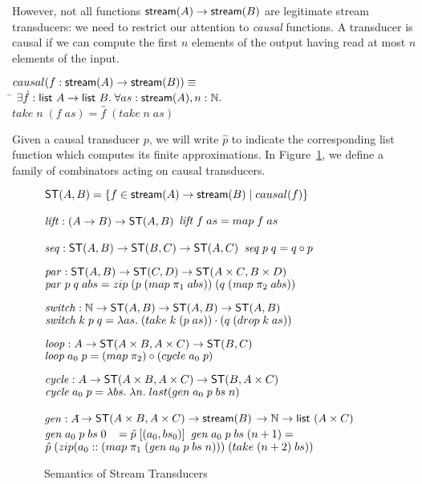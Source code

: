 \documentclass[preprint,natbib]{sigplanconf}
\begin{document}
However, not all functions $\mbox{\textsf{{stream}}}({A}) \to \mbox{\textsf{{stream}}}({B})$ are legitimate
stream transducers: we need to restrict our attention to \emph{causal}
functions. A transducer is causal if we can compute the first
$n$ elements of the output having read at most $n$ elements of
the input. 

\begin{tabbing}
$causal(f : \mbox{\textsf{{stream}}}({A}) \to \mbox{\textsf{{stream}}}({B})) \equiv$ \\
\;\;\= $\exists \hat{f} : \mbox{\textsf{{list }}}{A} \to \mbox{\textsf{{list }}}{B}.\;\forall as:\mbox{\textsf{{stream}}}({A}), n:\mathbb{N}.$ \\
    \> \;\;$take\;n\;(f\;as) = \hat{f}\;(take\;n\;as)$ 
\end{tabbing}

Given a causal transducer $p$, we will write $\hat{p}$ to indicate the
corresponding list function which computes its finite
approximations. In Figure~\ref{transducer-semantics}, we define a
family of combinators acting on causal transducers.

\begin{figure}
{\small
\begin{specification}
$\mbox{\textsf{{ST}}}({A}, {B}) = \{{{f \in \mbox{\textsf{{stream}}}({A}) \to \mbox{\textsf{{stream}}}({B})}\;|\;{causal(f)}}\}$

$\mathit{lift} : (A \to B) \to \mbox{\textsf{{ST}}}({A}, {B})$ \nextline
$\mathit{lift} \;f\;as = map\;f\;as$ 

$\mathit{seq}  : \mbox{\textsf{{ST}}}({A}, {B}) \to \mbox{\textsf{{ST}}}({B}, {C}) \to \mbox{\textsf{{ST}}}({A}, {C})$ \nextline
$\mathit{seq} \;p\;q = q \circ p$ 

$\mathit{par}  : \mbox{\textsf{{ST}}}({A}, {B}) \to \mbox{\textsf{{ST}}}({C}, {D}) \to \mbox{\textsf{{ST}}}({A \times C}, {B \times D})$ \nextline
$\mathit{par} \; p\;q\;abs = zip\; (p\;(map\;\pi_1\;abs))\;(q\;(\mathit{map}\;\pi_2\;abs))$

$\mathit{switch} : \mathbb{N} \to \mbox{\textsf{{ST}}}({A}, {B}) \to \mbox{\textsf{{ST}}}({A}, {B}) \to \mbox{\textsf{{ST}}}({A}, {B})$ \nextline
$\mathit{switch}\;k\;p\;q = \lambda as.\;(take\;k\;(p\;as))\cdot(q\;(drop\;k\;as))$ 

$\mathit{loop} : A \to \mbox{\textsf{{ST}}}({A\times B}, {A \times C}) \to \mbox{\textsf{{ST}}}({B}, {C})$ \nextline
$\mathit{loop}\;a_0\;p = (map\;\pi_2) \circ (cycle\;a_0\;p)$ 

$\mathit{cycle} : A \to \mbox{\textsf{{ST}}}({A\times B}, {A \times C}) \to \mbox{\textsf{{ST}}}({B}, {A \times C})$ \nextline
$\mathit{cycle}\;a_0\;p = \lambda bs.\;\lambda n.\;last(gen\;a_0\;p\;bs\;n)$ 

$\mathit{gen} : A $\=$\to \mbox{\textsf{{ST}}}({A\times B}, {A \times C}) \to \mbox{\textsf{{stream}}}({B})$ \nextline
                \>$\to \mathbb{N} \to \mbox{\textsf{{list }}}{(A \times C)}$\nextline
$\mathit{gen}\;a_0\;p\;bs\;0 \;\;\; = \hat{p}\; [(a_0, bs_0)]$ \nextline
$\mathit{gen}\;a_0\;p\;bs\;(n+1) = $ \nextline
\;\;$\hat{p}\;(zip (a_0 :: (map\;\pi_1\;(\mathit{gen}\;a_0\;p\;bs\;n)))\;
                                        (take\;(n+2)\;bs))$ 
\end{specification}
}
\caption{Semantics of Stream Transducers}
\label{transducer-semantics}
\end{figure}
\end{document}
